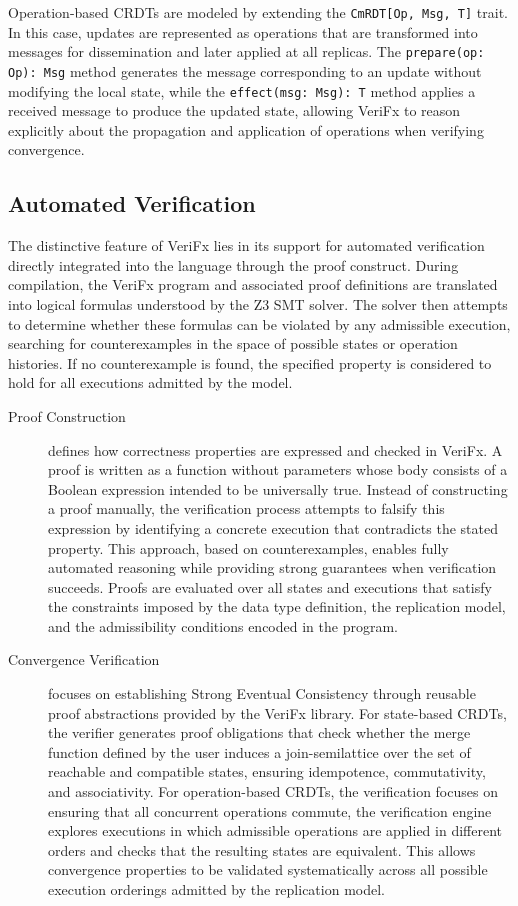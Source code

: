 Operation-based CRDTs are modeled by extending the \texttt{CmRDT[Op, Msg, T]} trait. In this case, updates are represented as operations that are transformed into messages for dissemination and later applied at all replicas. The \texttt{prepare(op: Op): Msg} method generates the message corresponding to an update without modifying the local state, while the \texttt{effect(msg: Msg): T} method applies a received message to produce the updated state, allowing VeriFx to reason explicitly about the propagation and application of operations when verifying convergence.

\subsection{Automated Verification}
\label{sub:automated_verification}

The distinctive feature of VeriFx lies in its support for automated verification directly integrated into the language through the proof construct. During compilation, the VeriFx program and associated proof definitions are translated into logical formulas understood by the Z3 SMT solver. The solver then attempts to determine whether these formulas can be violated by any admissible execution, searching for counterexamples in the space of possible states or operation histories. If no counterexample is found, the specified property is considered to hold for all executions admitted by the model.

\begin{description}
  \item[Proof Construction] defines how correctness properties are expressed and checked in VeriFx. A proof is written as a function without parameters whose body consists of a Boolean expression intended to be universally true. Instead of constructing a proof manually, the verification process attempts to falsify this expression by identifying a concrete execution that contradicts the stated property. This approach, based on counterexamples, enables fully automated reasoning while providing strong guarantees when verification succeeds. Proofs are evaluated over all states and executions that satisfy the constraints imposed by the data type definition, the replication model, and the admissibility conditions encoded in the program.

  \item[Convergence Verification] focuses on establishing Strong Eventual Consistency through reusable proof abstractions provided by the VeriFx library. For state-based CRDTs, the verifier generates proof obligations that check whether the merge function defined by the user induces a join-semilattice over the set of reachable and compatible states, ensuring idempotence, commutativity, and associativity. For operation-based CRDTs, the verification focuses on ensuring that all concurrent operations commute, the verification engine explores executions in which admissible operations are applied in different orders and checks that the resulting states are equivalent. This allows convergence properties to be validated systematically across all possible execution orderings admitted by the replication model.
\end{description}

